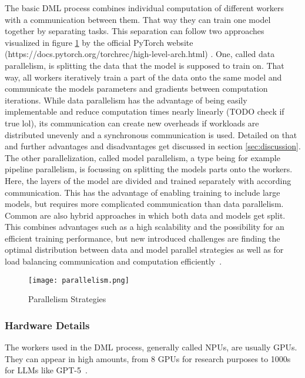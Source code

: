 The basic \ac{DML} process combines individual computation of different workers with a communication between them. That way they can train one model together by separating tasks. This separation can follow two approaches visualized in figure \ref{fig:parallelism} by the official PyTorch website (https://docs.pytorch.org/torchrec/high-level-arch.html) \cite{}.
One, called data parallelism, is splitting the data that the model is supposed to train on. That way, all workers iteratively train a part of the data onto the same model and communicate the models parameters and gradients between computation iterations. 
While data parallelism has the advantage of being easily implementable and reduce computation times nearly linearly (TODO check if true lol), its communication can create new overheads if workloads are distributed unevenly and a synchronous communication is used. Detailed on that and further advantages and disadvantages get discussed in section \ref{sec:discussion}.
The other parallelization, called model parallelism, a type being for example pipeline parallelism, is focussing on splitting the models parts onto the workers. Here, the layers of the model are divided and trained separately with according communication. This has the advantage of enabling training to include large models, but requires more complicated communication than data parallelism.
Common are also hybrid approaches in which both data and models get split. This combines advantages such as a high scalability and the possibility for an efficient training performance, but new introduced challenges are finding the optimal distribution  between data and model parallel strategies as well as for load balancing communication and computation efficiently~\cite{boehm_hybrid_2014}.

\begin{figure}[h]  %
  \centering
  \texttt{[image: parallelism.png]}
  \caption{Parallelism Strategies}
  \label{fig:parallelism}
\end{figure}

\subsubsection*{Hardware Details}
The workers used in the \ac{DML} process, generally called \acp{NPU}, are usually \acp{GPU}. They can appear in high amounts, from 8 \acp{GPU} for research purposes to 1000s for \acp{LLM} like GPT-5~\cite{}.

